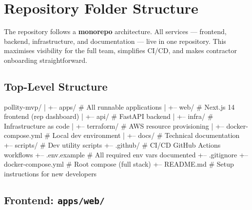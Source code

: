 \documentclass[12pt, a4paper]{article}
\begin{document}
\newpage

\section{Repository Folder Structure}

The repository follows a \textbf{monorepo} architecture. All services --- frontend, backend, infrastructure, and documentation --- live in one repository. This maximises visibility for the full team, simplifies CI/CD, and makes contractor onboarding straightforward.

\subsection{Top-Level Structure}

\begin{treebox}
pollity-mvp/
|
+-- apps/                    # All runnable applications
|   +-- web/                 # Next.js 14 frontend (rep dashboard)
|   +-- api/                 # FastAPI backend
|
+-- infra/                   # Infrastructure as code
|   +-- terraform/           # AWS resource provisioning
|   +-- docker-compose.yml   # Local dev environment
|
+-- docs/                    # Technical documentation
+-- scripts/                 # Dev utility scripts
+-- .github/                 # CI/CD GitHub Actions workflows
+-- .env.example             # All required env vars documented
+-- .gitignore
+-- docker-compose.yml       # Root compose (full stack)
+-- README.md                # Setup instructions for new developers
\end{treebox}

\subsection{Frontend: \texttt{apps/web/}}
\end{document}
